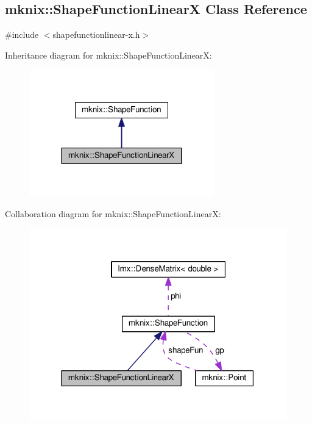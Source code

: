 \hypertarget{classmknix_1_1_shape_function_linear_x}{}\subsection{mknix\+:\+:Shape\+Function\+Linear\+X Class Reference}
\label{classmknix_1_1_shape_function_linear_x}


{\ttfamily \#include $<$shapefunctionlinear-\/x.\+h$>$}



Inheritance diagram for mknix\+:\+:Shape\+Function\+Linear\+X\+:\nopagebreak
\begin{figure}[H]
\begin{center}
\leavevmode
\includegraphics[width=227pt]{de/d1e/classmknix_1_1_shape_function_linear_x__inherit__graph}
\end{center}
\end{figure}


Collaboration diagram for mknix\+:\+:Shape\+Function\+Linear\+X\+:\nopagebreak
\begin{figure}[H]
\begin{center}
\leavevmode
\includegraphics[width=316pt]{d9/d1a/classmknix_1_1_shape_function_linear_x__coll__graph}
\end{center}
\end{figure}
